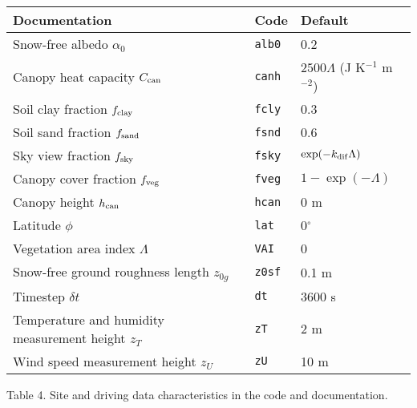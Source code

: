 \documentclass{article}
\begin{document}
\vskip20pt
\begin{tabular}{|l|l|l|}
\hline
Documentation & Code & Default \\
\hline
Snow-free albedo $\alpha_0$         & {\tt alb0} & 0.2                                 \\
Canopy heat capacity $C_{\rm can}$  & {\tt canh} & $2500\Lambda$ (J K$^{-1}$ m$^{-2}$) \\
Soil clay fraction $f_{\rm clay}$   & {\tt fcly} & 0.3                                 \\
Soil sand fraction $f_{\rm sand}$   & {\tt fsnd} & 0.6                                 \\
Sky view fraction $f_{\rm sky}$     & {\tt fsky} & $\exp(-k_{\rm dif}\Lambda)$         \\
Canopy cover fraction $f_{\rm veg}$ & {\tt fveg} & $1 - \exp(-\Lambda)$                \\
Canopy height $h_{\rm can}$         & {\tt hcan} & 0 m                                 \\
Latitude $\phi$                     & {\tt lat}  & 0$^\circ$                           \\
Vegetation area index $\Lambda$     & {\tt VAI}  & 0                                   \\
Snow-free ground roughness length $z_{0g}$ & {\tt z0sf} & 0.1 m                        \\
Timestep $\delta t$                 & {\tt dt}   & 3600 s                              \\
Temperature and humidity measurement height $z_T$& {\tt zT} & 2 m                      \\
Wind speed measurement height $z_U$ & {\tt zU}   & 10 m                                \\
\hline 
\end{tabular}

Table 4. Site and driving data characteristics in the code and documentation.
\end{document}
